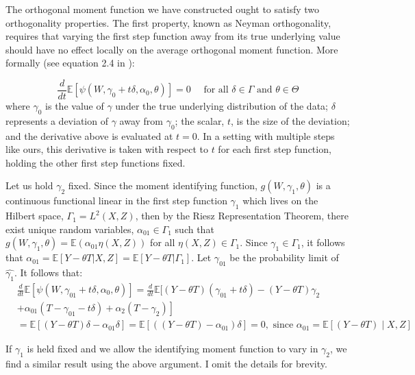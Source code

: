 The orthogonal moment function we have constructed ought to satisfy two orthogonality properties. The first property, known as Neyman orthogonality, requires that varying the first step function away from its true underlying value should have no effect locally on the average orthogonal moment function. More formally (see equation 2.4 in \citet{chernozhukov2022locally}):

\begin{equation}
\frac{d}{d t} \mathbb{E}\left[\psi\left(W, \gamma_0+t \delta, \alpha_0, \theta\right)\right]=0 \quad \text { for all } \delta \in \Gamma \text { and } \theta \in \Theta
\end{equation}
where $\gamma_0$ is the value of $\gamma$ under the true underlying distribution of the data; $\delta$ represents a deviation of $\gamma$ away from $\gamma_0$; the scalar, $t$, is the size of the deviation; and the derivative above is evaluated at $t=0$. In a setting with multiple steps like ours, this derivative is taken with respect to $t$ for each first step function, holding the other first step functions fixed. 

Let us hold $\gamma_2$ fixed. Since the moment identifying function, $g(W,\gamma_1, \theta)$ is a continuous functional linear in the first step function $\gamma_1$ which lives on the Hilbert space, $\Gamma_1=L^2(X,Z)$, then by the Riesz Representation Theorem, there exist unique random variables, $\alpha_{01} \in \Gamma_1$ such that $g(W,\gamma_1, \theta)=\mathbb{E}(\alpha_{01} \eta(X,Z))$ for all $\eta(X,Z) \in \Gamma_1$. Since $\gamma_1 \in \Gamma_1$, it follows that $\alpha_{01}=\mathbb{E}[Y-\theta T|X,Z]=\mathbb{E}[Y-\theta T|\Gamma_1]$. Let $\gamma_{01}$ be the probability limit of $\hat{\gamma_1}$. It follows that:
\begin{equation}
 \begin{split}
 &\frac{d}{d t} \mathbb{E}\left[\psi\left(W, \gamma_{01}+t \delta, \alpha_0, \theta\right)\right]=\frac{d}{d t}\mathbb{E}[(Y-\theta T)\left(\gamma_{01}+t \delta\right)-(Y-\theta T) \gamma_2 \\
 &+ \left.\alpha_{01}\left(T-\gamma_{01}-t \delta\right)+\alpha_2\left(T-\gamma_2\right)\right] \\
  &=\mathbb{E}\left[(Y-\theta T) \delta-\alpha_{01} \delta\right]= \mathbb{E}[((Y-\theta T)-\alpha_{01})\delta]=0,
\text{  since } \alpha_{01}= \mathbb{E}[(Y-\theta T) \mid X, Z]
\end{split}
\end{equation}

If $\gamma_1$ is held fixed and we allow the identifying moment function to vary in $\gamma_2$, we find a similar result using the above argument. I omit the details for brevity. 

